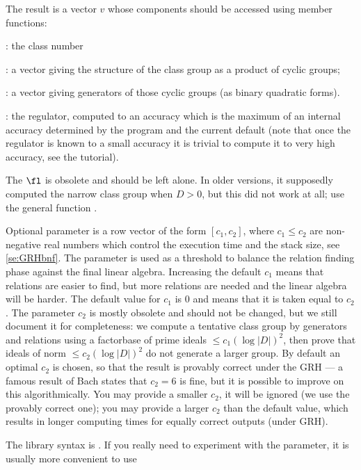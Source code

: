The result is a vector $v$ whose components should be accessed using member
functions:

\item {}: the class number

\item {}: a vector giving the structure of the class group as a
product of cyclic groups;

\item {}: a vector giving generators of those cyclic groups (as
binary quadratic forms).

\item {}: the regulator, computed to an accuracy which is the
maximum of an internal accuracy determined by the program and the current
default (note that once the regulator is known to a small accuracy it is
trivial to compute it to very high accuracy, see the tutorial).

The $\fl$ is obsolete and should be left alone. In older versions,
it supposedly computed the narrow class group when $D>0$, but this did not
work at all; use the general function .

Optional parameter  is a row vector of the form $[c_1, c_2]$,
where $c_1 \leq c_2$ are non-negative real numbers which control the execution
time and the stack size, see \ref{se:GRHbnf}. The parameter is used as a
threshold to balance the relation finding phase against the final linear
algebra. Increasing the default $c_1$ means that relations are easier
to find, but more relations are needed and the linear algebra will be
harder. The default value for $c_1$ is $0$ and means that it is taken equal
to $c_2$. The parameter $c_2$ is mostly obsolete and should not be changed,
but we still document it for completeness: we compute a tentative class
group by generators and relations using a factorbase of prime ideals
$\leq c_1 (\log |D|)^2$, then prove that ideals of norm
$\leq c_2 (\log |D|)^2$ do
not generate a larger group. By default an optimal $c_2$ is chosen, so that
the result is provably correct under the GRH --- a famous result of Bach
states that $c_2 = 6$ is fine, but it is possible to improve on this
algorithmically. You may provide a smaller $c_2$, it will be ignored
(we use the provably correct
one); you may provide a larger $c_2$ than the default value, which results
in longer computing times for equally correct outputs (under GRH).

The library syntax is .
If you really need to experiment with the  parameter, it is
usually more convenient to use


